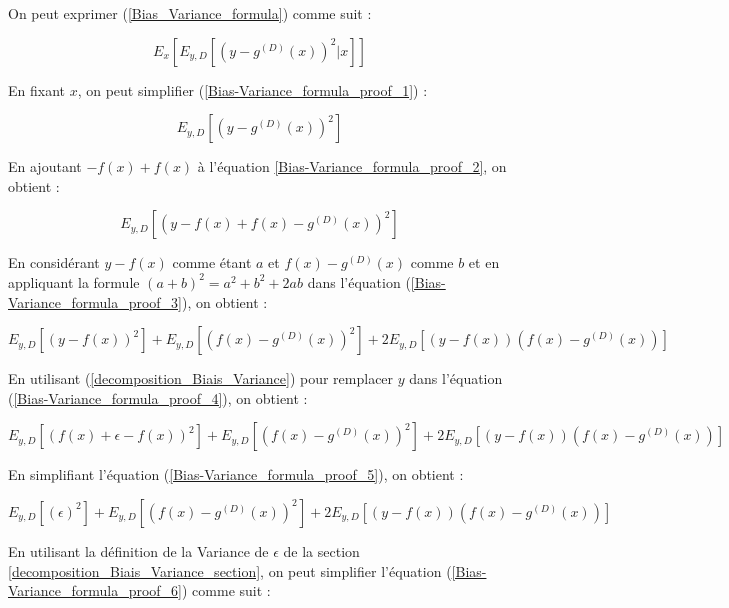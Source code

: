 \documentclass[a4paper]{article}
\begin{document}
On peut exprimer (\ref{Bias_Variance_formula}) comme suit : 

\begin{equation}
\label{Bias-Variance_formula_proof_1}
E_x [E_{y,D} [(y - g^{(D)}(x))^2 | x]]
\end{equation}

En fixant $x$, on peut simplifier (\ref{Bias-Variance_formula_proof_1}) :

\begin{equation}
\label{Bias-Variance_formula_proof_2}
E_{y,D}[ (y - g^{(D)}(x))^2]
\end{equation}

En ajoutant $ - f(x) + f(x) $ à l'équation \ref{Bias-Variance_formula_proof_2}, on obtient :

\begin{equation}
\label{Bias-Variance_formula_proof_3}
E_{y,D}[ (y - f(x) + f(x) - g^{(D)}(x))^2]
\end{equation}

En considérant $ y - f(x) $ comme étant $a$ et $ f(x) - g^{(D)}(x)$ comme $b$ et en appliquant la formule $(a+b)^2 = a^2 + b^2 + 2ab$ dans l'équation (\ref{Bias-Variance_formula_proof_3}), on obtient :

\begin{equation}
\label{Bias-Variance_formula_proof_4}
E_{y,D} [(y-f(x))^2] + E_{y,D} [(f(x) - g^{(D)}(x))^2] + 2E_{y,D} [(y-f(x)) (f(x) - g^{(D)}(x)) ]
\end{equation}

En utilisant (\ref{decomposition_Biais_Variance}) pour remplacer $y$ dans l'équation (\ref{Bias-Variance_formula_proof_4}), on obtient :

\begin{equation}
\label{Bias-Variance_formula_proof_5}
E_{y,D} [(f(x) + \epsilon - f(x))^2] + E_{y,D} [(f(x) - g^{(D)}(x))^2] + 2E_{y,D} [(y-f(x)) (f(x) - g^{(D)}(x)) ]
\end{equation}

En simplifiant l'équation (\ref{Bias-Variance_formula_proof_5}), on obtient :

\begin{equation}
\label{Bias-Variance_formula_proof_6}
E_{y,D} [(\epsilon)^2] + E_{y,D} [(f(x) - g^{(D)}(x))^2] + 2E_{y,D} [(y-f(x)) (f(x) - g^{(D)}(x)) ]
\end{equation}

En utilisant la définition de la Variance de $\epsilon$ de la section \ref{decomposition_Biais_Variance_section}, on peut simplifier l'équation (\ref{Bias-Variance_formula_proof_6}) comme suit :
\end{document}
